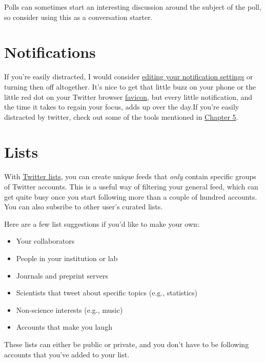 \documentclass[
]{book}
\providecommand{\tightlist}{%
  \setlength{\itemsep}{0pt}\setlength{\parskip}{0pt}}
\begin{document}
Polls can sometimes start an interesting discussion around the subject of the poll, so consider using this as a conversation starter.

\hypertarget{notifications}{%
\section*{Notifications}\label{notifications}}

If you're easily distracted, I would consider \href{https://help.twitter.com/en/managing-your-account/notifications-on-mobile-devices}{editing your notification settings} or turning then off altogether. It's nice to get that little buzz on your phone or the little red dot on your Twitter browser \href{https://en.wikipedia.org/wiki/Favicon}{favicon}, but every little notification, and the time it takes to regain your focus, adds up over the day.If you're easily distracted by twitter, check out some of the tools mentioned in \protect\hyperlink{care}{Chapter 5}.

\hypertarget{lists}{%
\section*{Lists}\label{lists}}

With \href{https://help.twitter.com/en/using-twitter/twitter-lists}{Twitter lists}, you can create unique feeds that \emph{only} contain specific groups of Twitter accounts. This is a useful way of filtering your general feed, which can get quite busy once you start following more than a couple of hundred accounts. You can also subsribe to other user's curated lists.

Here are a few list suggestions if you'd like to make your own:

\begin{itemize}
\tightlist
\item
  Your collaborators
\item
  People in your institution or lab
\item
  Journals and preprint servers
\item
  Scientists that tweet about specific topics (e.g., statistics)
\item
  Non-science interests (e.g., music)
\item
  Accounts that make you laugh
\end{itemize}

These lists can either be public or private, and you don't have to be following accounts that you've added to your list.
\end{document}
